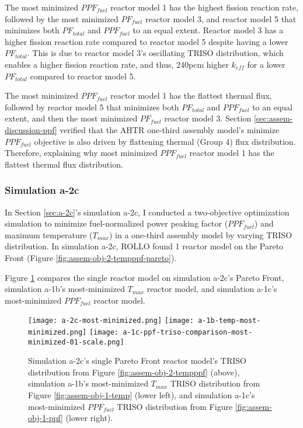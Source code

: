 The most minimized $PPF_{fuel}$ reactor model 1 has the highest fission reaction rate, 
followed by the most minimized $PF_{fuel}$ reactor model 3, and reactor model 5 that 
minimizes both $PF_{total}$ and $PPF_{fuel}$ to an equal extent.
Reactor model 3 has a higher fission reaction rate compared to reactor model 5 despite having 
a lower $PF_{total}$.
This is due to reactor model 3's oscillating TRISO distribution, which enables
a higher fission reaction rate, and thus, 240pcm higher $k_{eff}$ for a lower $PF_{total}$
compared to reactor model 5. 

The most minimized $PPF_{fuel}$ reactor model 1 has the flattest thermal flux, followed by 
reactor model 5 that minimizes both $PF_{total}$ and $PPF_{fuel}$ to an equal extent, and 
then the most minimized $PF_{fuel}$ reactor model 3. 
Section \ref{sec:assem-discussion-ppf} verified that the \gls{AHTR} one-third assembly model's 
minimize $PPF_{fuel}$ objective is also driven by flattening thermal (Group 4) flux 
distribution. 
Therefore, explaining why most minimized $PPF_{fuel}$ reactor model 1 has the flattest 
thermal flux distribution. 


\subsubsection{Simulation a-2c}
In Section \ref{sec:a-2c}'s simulation a-2c, I conducted a two-objective 
optimization simulation to minimize fuel-normalized power peaking factor ($PPF_{fuel}$) 
and maximum temperature ($T_{max}$) in a one-third assembly model by varying 
TRISO distribution. 
In simulation a-2c, ROLLO found 1 reactor model on the Pareto Front (Figure 
\ref{fig:assem-obj-2-tempppf-pareto}). 

Figure \ref{fig:a-2c-triso-comparison} compares the single reactor model on simulation 
a-2c's Pareto Front, simulation a-1b's most-minimized $T_{max}$ reactor model, and 
simulation a-1c's most-minimized $PPF_{fuel}$ reactor model. 
\begin{figure}[htbp!]
    \centering
    \texttt{[image: a-2c-most-minimized.png]} 
    \texttt{[image: a-1b-temp-most-minimized.png]} 
    \texttt{[image: a-1c-ppf-triso-comparison-most-minimized-01-scale.png]} 
    \caption{Simulation a-2c's single Pareto Front reactor model's TRISO distribution 
    from Figure \ref{fig:assem-obj-2-tempppf} (above), simulation a-1b's most-minimized 
    $T_{max}$ TRISO distribution from Figure \ref{fig:assem-obj-1-temp} (lower left), and 
    simulation a-1c's most-minimized $PPF_{fuel}$ TRISO distribution from Figure 
    \ref{fig:assem-obj-1-ppf} (lower right).}
    \label{fig:a-2c-triso-comparison}
\end{figure}

